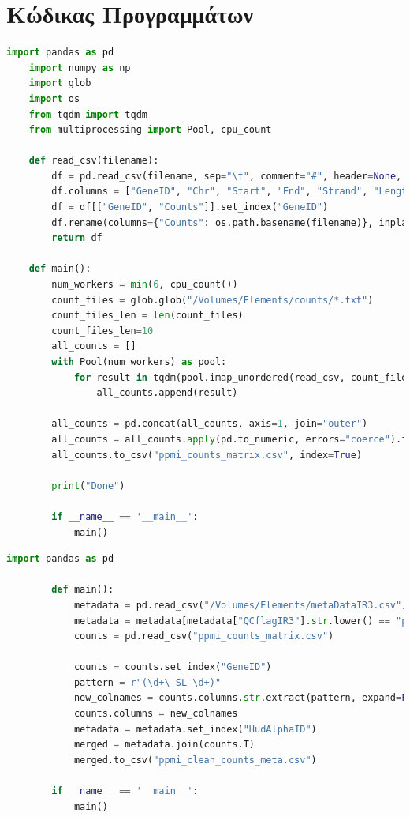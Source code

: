 \documentclass[12pt]{report}
\begin{document}
    \section*{Κώδικας Προγραμμάτων}\label{thesis:code}
    \begin{lstlisting}[language=Python,caption={read-data.py: Συκγρότηση CSV αρχείου με το σύνολο των δειγμάτων},label=lst:readdatapy]
    import pandas as pd
    import numpy as np
    import glob
    import os
    from tqdm import tqdm
    from multiprocessing import Pool, cpu_count
    
    def read_csv(filename):
        df = pd.read_csv(filename, sep="\t", comment="#", header=None, skiprows=1)
        df.columns = ["GeneID", "Chr", "Start", "End", "Strand", "Length", "Counts"]
        df = df[["GeneID", "Counts"]].set_index("GeneID")
        df.rename(columns={"Counts": os.path.basename(filename)}, inplace=True)
        return df
    
    def main():
        num_workers = min(6, cpu_count())
        count_files = glob.glob("/Volumes/Elements/counts/*.txt")
        count_files_len = len(count_files)
        count_files_len=10
        all_counts = []
        with Pool(num_workers) as pool:
            for result in tqdm(pool.imap_unordered(read_csv, count_files[1:10]), total=count_files_len, desc="Reading files"):
                all_counts.append(result)
    
        all_counts = pd.concat(all_counts, axis=1, join="outer")
        all_counts = all_counts.apply(pd.to_numeric, errors="coerce").fillna(0)
        all_counts.to_csv("ppmi_counts_matrix.csv", index=True)
    
        print("Done")

        if __name__ == '__main__':
            main()
    \end{lstlisting}
    \begin{lstlisting}[language=Python,caption={prepare-data.py: Εισαγωγή Metadata και φιλτράρισμα ακατάλληλων δειγμάτων},label=lst:preparedatapy]
        import pandas as pd
    
        def main():
            metadata = pd.read_csv("/Volumes/Elements/metaDataIR3.csv")
            metadata = metadata[metadata["QCflagIR3"].str.lower() == "pass"]
            counts = pd.read_csv("ppmi_counts_matrix.csv")
        
            counts = counts.set_index("GeneID")
            pattern = r"(\d+\-SL-\d+)"
            new_colnames = counts.columns.str.extract(pattern, expand=False)
            counts.columns = new_colnames
            metadata = metadata.set_index("HudAlphaID")
            merged = metadata.join(counts.T)
            merged.to_csv("ppmi_clean_counts_meta.csv")
        
        if __name__ == '__main__':
            main()
    \end{lstlisting}
\end{document}
